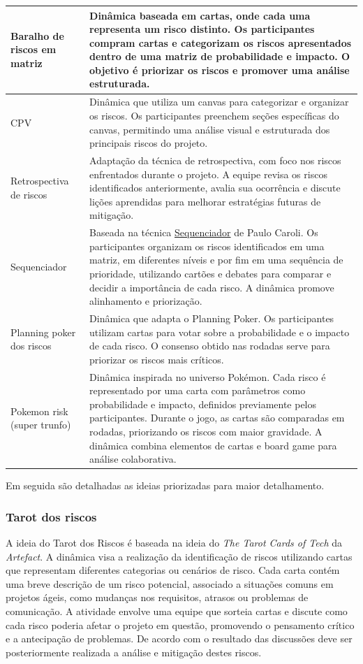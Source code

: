 \documentclass[
	12pt,
	openright,
	twoside,
	a4paper,
	english,
	brazil
	]{abntex2}
\begin{document}
\begin{longtable}{|p{3cm}|p{12cm}|}
  Baralho de riscos em matriz & Dinâmica baseada em cartas, onde cada uma representa um risco distinto. Os participantes compram cartas e categorizam os riscos apresentados dentro de uma matriz de probabilidade e impacto. O objetivo é priorizar os riscos e promover uma análise estruturada. \\ \hline
  CPV & Dinâmica que utiliza um canvas para categorizar e organizar os riscos. Os participantes preenchem seções específicas do canvas, permitindo uma análise visual e estruturada dos principais riscos do projeto. \\ \hline
  Retrospectiva de riscos & Adaptação da técnica de retrospectiva, com foco nos riscos enfrentados durante o projeto. A equipe revisa os riscos identificados anteriormente, avalia sua ocorrência e discute lições aprendidas para melhorar estratégias futuras de mitigação. \\ \hline
  Sequenciador & Baseada na técnica \href{https://caroli.org/sequenciador/}{Sequenciador} de Paulo Caroli. Os participantes organizam os riscos identificados em uma matriz, em diferentes níveis e por fim em uma sequência de prioridade, utilizando cartões e debates para comparar e decidir a importância de cada risco. A dinâmica promove alinhamento e priorização. \\ \hline
  Planning poker dos riscos & Dinâmica que adapta o Planning Poker. Os participantes utilizam cartas para votar sobre a probabilidade e o impacto de cada risco. O consenso obtido nas rodadas serve para priorizar os riscos mais críticos. \\ \hline
  Pokemon risk (super trunfo) & Dinâmica inspirada no universo Pokémon. Cada risco é representado por uma carta com parâmetros como probabilidade e impacto, definidos previamente pelos participantes. Durante o jogo, as cartas são comparadas em rodadas, priorizando os riscos com maior gravidade. A dinâmica combina elementos de cartas e board game para análise colaborativa. \\ \hline
\end{longtable}

Em seguida são detalhadas as ideias priorizadas para maior detalhamento.

\subsubsection{Tarot dos riscos}

A ideia do Tarot dos Riscos é baseada na ideia do \textit{The Tarot Cards of Tech} da \textit{Artefact}. A dinâmica visa a realização da identificação de riscos utilizando cartas que representam diferentes categorias ou cenários de risco. Cada carta contém uma breve descrição de um risco potencial, associado a situações comuns em projetos ágeis, como mudanças nos requisitos, atrasos ou problemas de comunicação. A atividade envolve uma equipe que sorteia cartas e discute como cada risco poderia afetar o projeto em questão, promovendo o pensamento crítico e a antecipação de problemas. De acordo com o resultado das discussões deve ser posteriormente realizada a análise e mitigação destes riscos.
\end{document}
